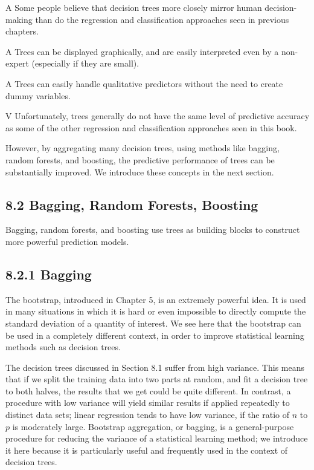 \documentclass[10pt]{article}
\begin{document}
A Some people believe that decision trees more closely mirror human decision-making than do the regression and classification approaches seen in previous chapters.

A Trees can be displayed graphically, and are easily interpreted even by a non-expert (especially if they are small).

A Trees can easily handle qualitative predictors without the need to create dummy variables.

V Unfortunately, trees generally do not have the same level of predictive accuracy as some of the other regression and classification approaches seen in this book.

However, by aggregating many decision trees, using methods like bagging, random forests, and boosting, the predictive performance of trees can be substantially improved. We introduce these concepts in the next section.

\subsection*{8.2 Bagging, Random Forests, Boosting}
Bagging, random forests, and boosting use trees as building blocks to construct more powerful prediction models.

\subsection*{8.2.1 Bagging}
The bootstrap, introduced in Chapter 5, is an extremely powerful idea. It is used in many situations in which it is hard or even impossible to directly compute the standard deviation of a quantity of interest. We see here that the bootstrap can be used in a completely different context, in order to improve statistical learning methods such as decision trees.

The decision trees discussed in Section 8.1 suffer from high variance. This means that if we split the training data into two parts at random, and fit a decision tree to both halves, the results that we get could be quite different. In contrast, a procedure with low variance will yield similar results if applied repeatedly to distinct data sets; linear regression tends to have low variance, if the ratio of $n$ to $p$ is moderately large. Bootstrap aggregation, or bagging, is a general-purpose procedure for reducing the variance of a statistical learning method; we introduce it here because it is particularly useful and frequently used in the context of decision trees.
\end{document}
